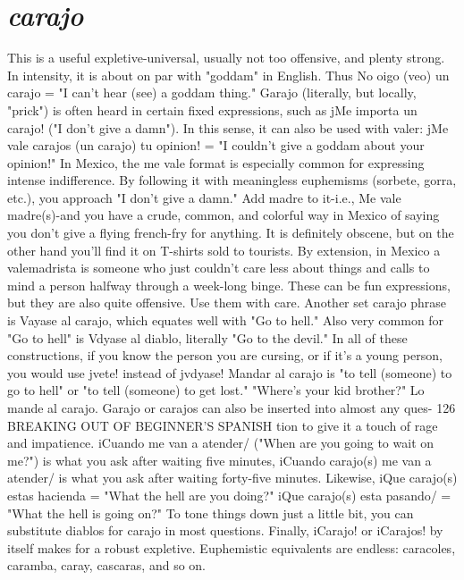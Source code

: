 \documentclass[14pt,a4paper,oneside]{memoir}
\begin{document}
\section{\emph{carajo}}

This is a useful expletive-universal, usually not too offensive, and plenty strong. In intensity, it is about on par with "goddam"
in English. Thus No oigo (veo) un carajo = "I can't hear (see) a goddam thing." Garajo (literally, but locally, "prick") is often heard in certain fixed expressions, such as jMe importa un carajo! ("I don't give a
damn"). In this sense, it can also be used with valer: jMe vale carajos
(un carajo) tu opinion! = "I couldn't give a goddam about your
opinion!"
In Mexico, the me vale format is especially common for expressing intense indifference. By following it with meaningless euphemisms (sorbete, gorra, etc.), you approach "I don't give a damn." Add
madre to it-i.e., Me vale madre(s)-and you have a crude, common,
and colorful way in Mexico of saying you don't give a flying french-fry
for anything. It is definitely obscene, but on the other hand you'll find
it on T-shirts sold to tourists. By extension, in Mexico a valemadrista
is someone who just couldn't care less about things and calls to mind
a person halfway through a week-long binge. These can be fun expressions, but they are also quite offensive. Use them with care.
Another set carajo phrase is Vayase al carajo, which equates
well with "Go to hell." Also very common for "Go to hell" is Vdyase
al diablo, literally "Go to the devil." In all of these constructions, if
you know the person you are cursing, or if it's a young person, you
would use jvete! instead of jvdyase! Mandar al carajo is "to tell (someone) to go to hell" or "to tell (someone) to get lost." "Where's your kid
brother?" Lo mande al carajo.
Garajo or carajos can also be inserted into almost any ques-
126 BREAKING OUT OF BEGINNER'S SPANISH
tion to give it a touch of rage and impatience. iCuando me van a atender/ ("When are you going to wait on me?") is what you ask after waiting five minutes, iCuando carajo(s) me van a atender/ is what you ask
after waiting forty-five minutes. Likewise, iQue carajo(s) estas hacienda = "What the hell are you doing?" iQue carajo(s) esta pasando/
= "What the hell is going on?" To tone things down just a little bit,
you can substitute diablos for carajo in most questions.
Finally, iCarajo! or iCarajos! by itself makes for a robust expletive. Euphemistic equivalents are endless: caracoles, caramba,
caray, cascaras, and so on.
\end{document}
